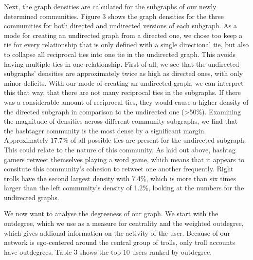 \documentclass[12pt, titlepage=true, toc=bib]{scrartcl}
\begin{document}
Next, the graph densities are calculated for the subgraphs of our newly determined communities. Figure 3 shows the graph densities for the three communities for both directed and undirected versions of each subgraph. As a mode for creating an undirected graph from a directed one, we chose too keep a tie for every relationship that is only defined with a single directional tie, but also to collapse all reciprocal ties into one tie in the undirected graph. This avoids having multiple ties in one relationship. First of all, we see that the undirected subgraphs' densities are approximately twice as high as directed ones, with only minor deficits. With our mode of creating an undirected graph, we can interpret this that way, that there are not many reciprocal ties in the subgraphs. If there was a considerable amount of reciprocal ties, they would cause a higher density of the directed subgraph in comparison to the undirected one (>50\%).
Examining the magnitude of densities across different community subgraphs, we find that the hashtager community is the most dense by a significant margin. Approximately 17.7\% of all possible ties are present for the undirected subgraph. This could relate to the nature of this community. As laid out above, hashtag gamers retweet themselves playing a word game, which means that it appears to consitute this community's cohesion to retweet one another frequently. Right trolls have the second largest density with 7.4\%, which is more than six times larger than the left community's density of 1.2\%, looking at the numbers for the undirected graphs.

We now want to analyse the degreeness of our graph. We start with the outdegree, which we use as a measure for centrality and the weighted outdegree, which gives addional information on the activity of the user. Because of our network is ego-centered around the central group of trolls, only troll accounts have outdegrees. Table 3 shows the top 10 users ranked by outdegree.
\end{document}
